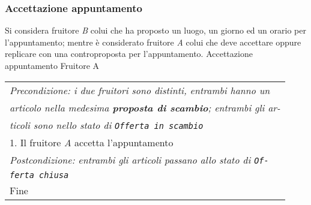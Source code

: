 \begin{minipage}{\textwidth}
    \subsubsection{Accettazione appuntamento}
    Si considera fruitore \textit{B} colui che ha proposto un luogo, un giorno ed un orario per l'appuntamento; mentre è considerato fruitore \textit{A} colui che deve accettare oppure replicare con una controproposta per l'appuntamento.
    \usecase
        {Accettazione appuntamento}
        {
            Fruitore A\\
        }
        {
            \begin{tabular}{l}
                \textit{Precondizione: i due fruitori sono distinti, entrambi hanno un}\\
                \textit{articolo nella medesima \textbf{proposta di scambio}; entrambi gli ar-}\\
                \textit{ticoli sono nello stato di \texttt{Offerta in scambio}}\\
                1. Il fruitore \textit{A} accetta l'appuntamento\\
                \textit{Postcondizione: entrambi gli articoli passano allo stato di \texttt{Of-}}\\
                \textit{\texttt{ferta chiusa}}\\
                Fine
            \end{tabular}\\

            \\

            \\
        }
        \vspace{0.5cm}
\end{minipage}